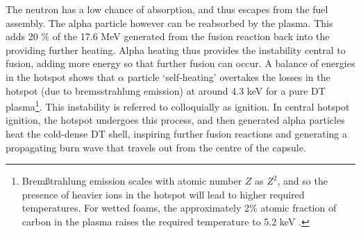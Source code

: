 The neutron has a low chance of absorption, and thus escapes from the fuel assembly. The alpha particle however can be reabsorbed by the plasma. This adds 20 \% of the 17.6 MeV generated from the fusion reaction back into the providing further heating. Alpha heating thus provides the instability central to fusion, adding more energy so that further fusion can occur. A balance of energies in the hotspot shows that $\alpha$ particle `self-heating' overtakes the losses in the hotspot (due to bremsstrahlung emission) at around 4.3 keV for a pure DT plasma\footnote{Brem{\ss}trahlung emission scales with atomic number $Z$ as $Z^2$, and so the presence of heavier ions in the hotspot will lead to higher required temperatures. For wetted foams, the approximately 2\% atomic fraction of carbon in the plasma raises the required temperature to 5.2 keV \cite{Olson2013}.}. This instability is referred to colloquially as ignition. In central hotspot ignition, the hotspot undergoes this process, and then generated alpha particles heat the cold-dense DT shell, inspiring further fusion reactions and generating a propagating burn wave that travels out from the centre of the capsule.

